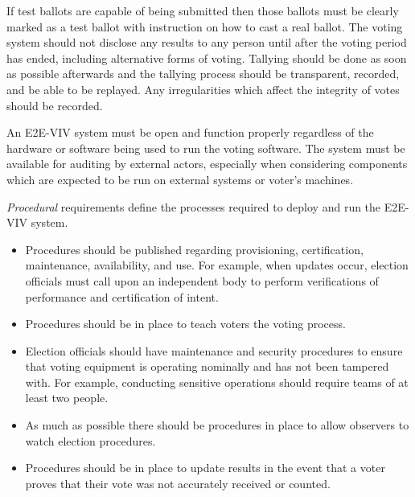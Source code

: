 If test ballots are capable of being submitted then those ballots must be
clearly marked as a test ballot with instruction on how to cast a real ballot.
The voting system should not disclose any results to any person until after the
voting period has ended, including alternative forms of voting. Tallying should
be done as soon as possible afterwards and the tallying process should be
transparent, recorded, and be able to be replayed. Any irregularities which
affect the integrity of votes should be recorded.

An E2E-VIV system must be open and function properly regardless of the hardware
or software being used to run the voting software. The system must be available
for auditing by external actors, especially when considering components which
are expected to be run on external systems or voter's machines.

\emph{Procedural} requirements define the processes required to deploy and run
the E2E-VIV system.

\begin{itemize}
  \item Procedures should be published regarding provisioning, certification,
    maintenance, availability, and use. For example, when updates occur,
    election officials must call upon an independent body to perform
    verifications of performance and certification of intent.

  \item Procedures should be in place to teach voters the voting process.

  \item Election officials should have maintenance and security procedures to
    ensure that voting equipment is operating nominally and has not been
    tampered with. For example, conducting sensitive operations should require
    teams of at least two people.

  \item As much as possible there should be procedures in place to allow
    observers to watch election procedures.

  \item Procedures should be in place to update results in the event that a
    voter proves that their vote was not accurately received or counted.
\end{itemize}

